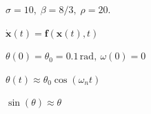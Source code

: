 \documentclass[multi={mymath},border=1pt]{standalone}
\newenvironment{mymath}{$\displaystyle}{$}
\begin{document}
\begin{mymath}
  \sigma = 10, \; \beta = 8/3, \; \rho = 20 .
\end{mymath}

\begin{mymath}
  \mathbf{\dot{x}}(t) = \mathbf{f}(\mathbf{x}(t), t)
\end{mymath}

\begin{mymath}
  \theta(0) = \theta_0 = 0.1 \, \text{rad}, \: \omega(0) = 0
\end{mymath}

\begin{mymath}
  \theta(t) \approx \theta_0 \cos(\omega_n t)
\end{mymath}

\begin{mymath}
\sin(\theta) \approx \theta
\end{mymath}
    
  
\end{document}
